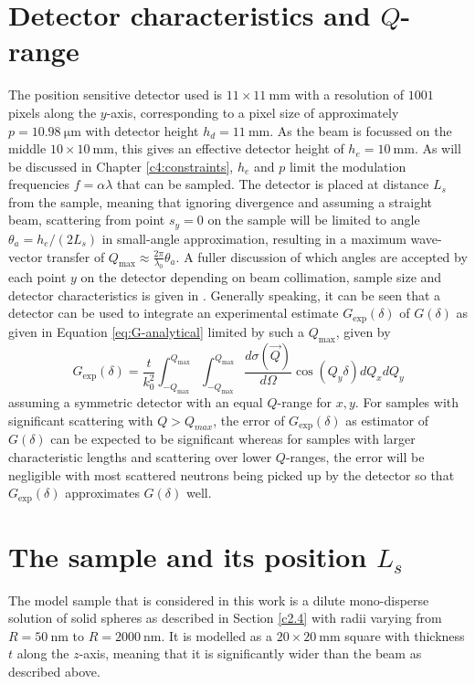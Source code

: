 \section{Detector characteristics and $Q$-range}
\label{c3.4}
The position sensitive detector used is $11\times11~\unit{\milli\meter}$ with a resolution of $1001$ pixels along the $y$-axis, corresponding to a pixel size of approximately $p = \SI{10.98}{\micro\meter}$ with detector height $h_d = \SI{11}{\milli\meter}$. As the beam is focussed on the middle $10\times10~\unit{\milli\meter}$, this gives an effective detector height of $h_e = \SI{10}{\milli\meter}$. As will be discussed in Chapter \ref{c4:constraints}, $h_e$ and $p$ limit the modulation frequencies $f = \alpha\lambda$ that can be sampled. The detector is placed at distance $L_s$ from the sample, meaning that ignoring divergence and assuming a straight beam, scattering from point $s_y = 0$ on the sample will be limited to angle $\theta_a = h_e/(2L_s)$ in small-angle approximation, resulting in a maximum wave-vector transfer of $Q_\text{max} \approx \frac{2\pi}{\lambda_0}\theta_a$. A fuller discussion of which angles are accepted by each point $y$ on the detector depending on beam collimation, sample size and detector characteristics is given in \cite{kusmin2017}. Generally speaking, it can be seen that a detector can be used to integrate an experimental estimate $G_\text{exp}(\delta)$ of $G(\delta)$ as given in Equation \eqref{eq:G-analytical} limited by such a $Q_\text{max}$, given by 
\begin{equation}
	G_\text{exp}(\delta) = \frac{t}{k_0^2}\int_{-Q_\text{max}}^{Q_\text{max}}\int_{-Q_\text{max}}^{Q_\text{max}}\dfrac{d\sigma(\vec{Q})}{d\Omega}\cos(Q_y \delta)dQ_xdQ_y  \label{eq:G-experimental}
\end{equation}
assuming a symmetric detector with an equal $Q$-range for $x,y$. For samples with significant scattering with $Q > Q_{max}$, the error of $G_\text{exp}(\delta)$ as estimator of $G(\delta)$ can be expected to be significant whereas for samples with larger characteristic lengths and scattering over lower $Q$-ranges, the error will be negligible with most scattered neutrons being picked up by the detector \cite{rekveldt1996} so that $G_\text{exp}(\delta)$ approximates $G(\delta)$ well. 

\section{The sample and its position $L_s$}
\label{c3.5}
The model sample that is considered in this work is a dilute mono-disperse solution of solid spheres as described in Section \ref{c2.4} with radii varying from $R = \SI{50}{\nano\meter}$ to $R = \SI{2000}{\nano\meter}$. It is modelled as a $20\times20~\unit{\milli\meter}$ square with thickness $t$ along the $z$-axis, meaning that it is significantly wider than the beam as described above. 

